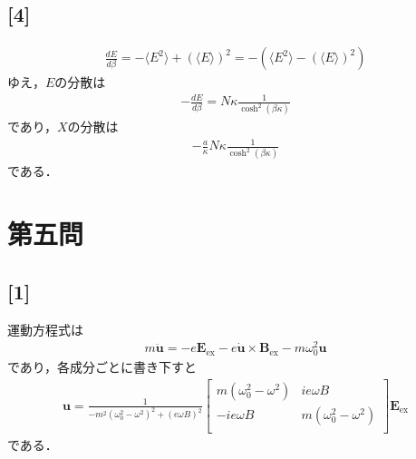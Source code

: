 \documentclass[12pt,dvipdfmx]{jsarticle}
\begin{document}
\subsection*{\large{[4]}}
\begin{eqnarray}
  \frac{dE}{d\beta} = - \langle E^2 \rangle + (\langle E \rangle )^2 = -\left( \langle E^2 \rangle- (\langle E \rangle )^2 \right)
\end{eqnarray}
ゆえ，$E$の分散は
\begin{eqnarray}
  -\frac{dE}{d\beta} = N\kappa \frac{1}{\cosh^2(\beta\kappa)}
\end{eqnarray}
であり，$X$の分散は
\begin{eqnarray}
  -\frac{a}{\kappa}N\kappa \frac{1}{\cosh^2(\beta\kappa)} 
\end{eqnarray}
である．
\newpage
\section*{\Large{第五問}}
\subsection*{\large{[1]}}
運動方程式は
\begin{eqnarray}
  m\ddot{\bm{u}} = -e\bm{E}_{\text{ex}} - e\dot{\bm{u}}\times\bm{B}_{\text{ex}} - m\omega_0^2 \bm{u}
\end{eqnarray}
であり，各成分ごとに書き下すと
\begin{eqnarray}
  \bm{u}
  =\frac{1}{-m^2(\omega_0^2-\omega^2)^2+(e\omega B)^2} 
  \begin{bmatrix}
    m(\omega_0^2-\omega^2) & ie\omega B\\
    -ie\omega B & m(\omega_0^2-\omega^2) \\
  \end{bmatrix}
  \bm{E}_{\text{ex}}
\end{eqnarray}
である．
\end{document}

